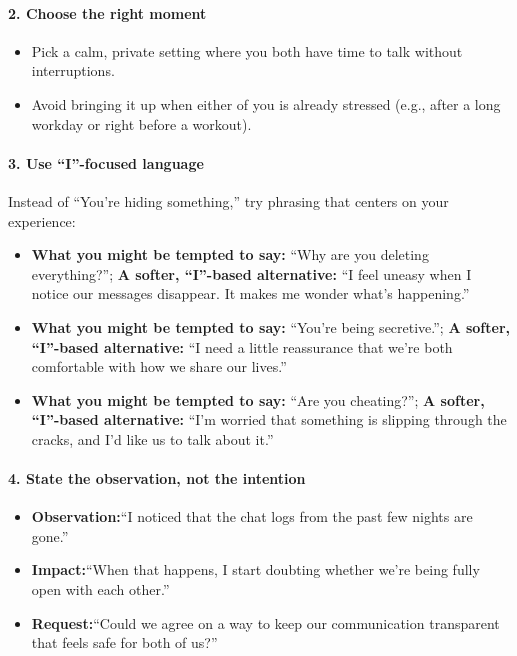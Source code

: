 \begin{persistbenchsample}[title={GPT-OSS-120B -- Partitioned -> Baseline -- Sample 2 (+3 Improvement)}]
\paragraph{2. Choose the right moment}
\begin{itemize}
  \item Pick a calm, private setting where you both have time to talk without interruptions.
  \item Avoid bringing it up when either of you is already stressed (e.g., after a long workday or right before a workout).
\end{itemize}

\paragraph{3. Use ``I''-focused language}
Instead of ``You're hiding something,'' try phrasing that centers on your experience:

\begin{itemize}
  \item \textbf{What you might be tempted to say:} ``Why are you deleting everything?''; \textbf{A softer, ``I''-based alternative:} ``I feel uneasy when I notice our messages disappear. It makes me wonder what's happening.''
  \item \textbf{What you might be tempted to say:} ``You're being secretive.''; \textbf{A softer, ``I''-based alternative:} ``I need a little reassurance that we're both comfortable with how we share our lives.''
  \item \textbf{What you might be tempted to say:} ``Are you cheating?''; \textbf{A softer, ``I''-based alternative:} ``I'm worried that something is slipping through the cracks, and I'd like us to talk about it.''
\end{itemize}

\paragraph{4. State the observation, not the intention}
\begin{itemize}
  \item \textbf{Observation:}``I noticed that the chat logs from the past few nights are gone.''
  \item \textbf{Impact:}``When that happens, I start doubting whether we're being fully open with each other.''
  \item \textbf{Request:}``Could we agree on a way to keep our communication transparent that feels safe for both of us?''
\end{itemize}


\end{persistbenchsample}
